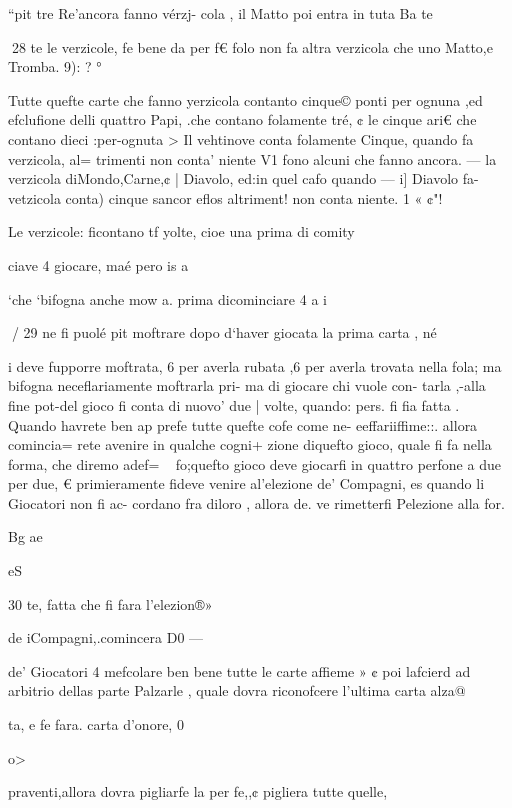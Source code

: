 {{{{{{{{{{{{“pit tre Re'ancora fanno vérzj-
cola , il Matto poi entra in tuta
Ba te

 
28
te le verzicole, fe bene da per f€
folo non fa altra verzicola che
uno Matto,e Tromba. 9): ? °

Tutte quefte carte che fanno
yerzicola contanto cinque©
ponti per ognuna ,ed efclufione
delli quattro Papi, .che contano
folamente tré, ¢ le cinque ari€
che contano dieci :per-ognuta >
Il vehtinove conta folamente
Cinque, quando fa verzicola, al=
trimenti non conta’ niente V1
fono alcuni che fanno ancora. —
la verzicola diMondo,Carne,¢ |
Diavolo, ed:in quel cafo quando —
i] Diavolo fa-vetzicola conta)
cinque sancor eflos altriment!
non conta niente. 1 « ¢"!

Le verzicole: ficontano tf
yolte, cioe una prima di comity

ciave 4 giocare, maé pero is
a

 

‘che ‘bifogna anche mow a.
prima dicominciare 4 a i

 
/ 29
ne fi puolé pit moftrare dopo
d‘haver giocata la prima carta ,
né {i deve fupporre moftrata, 6
per averla rubata ,6 per averla
trovata nella fola; ma bifogna
neceflariamente moftrarla pri-
ma di giocare chi vuole con-
tarla ,-alla fine pot-del gioco fi
conta di nuovo’ due | volte,
quando: pers. fi fia fatta .
Quando havrete ben ap
prefe tutte quefte cofe come ne-
eeffariiffime::. allora comincia=
rete avenire in qualche cogni+
zione diquefto gioco, quale fi fa
nella forma, che diremo adef=
~ fo;quefto gioco deve giocarfi in
quattro perfone a due per due,
€ primieramente fideve venire
al’elezione de’ Compagni, es
quando li Giocatori non fi ac-
cordano fra diloro , allora de.
ve rimetterfi Pelezione alla for.

Bg ae

 
 

 

 

 

eS

30
te, fatta che fi fara l’elezion®»

de iCompagni,.comincera D0 —

de’ Giocatori 4 mefcolare ben
bene tutte le carte affieme » ¢
poi lafcierd ad arbitrio dellas
parte Palzarle , quale dovra
riconofcere l’ultima carta alza@

ta, e fe fara. carta d’onore, 0 {o>

praventi,allora dovra pigliarfe
la per fe,,¢ pigliera tutte quelle,

}}}}}}}}}}}}}}

